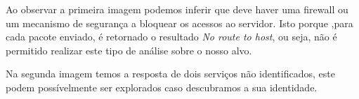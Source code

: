 \par Ao observar a primeira imagem podemos inferir que deve haver uma firewall ou um mecanismo de segurança a bloquear os acessos ao servidor. Isto porque ,para cada pacote enviado, é retornado o resultado \textit{No route to host}, ou seja, não é permitido realizar este tipo de análise sobre o nosso alvo.\newline
\par Na segunda imagem temos a resposta de dois serviços não identificados, este podem possívelmente ser explorados caso descubramos a sua identidade.\newline

